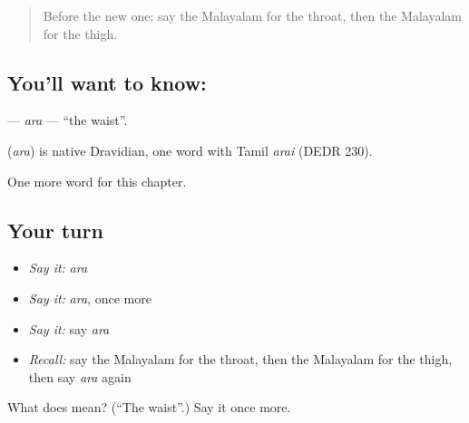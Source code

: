 \begin{quote}
Before the new one: say the Malayalam for the throat, then the Malayalam for the thigh.
\end{quote}

\subsection*{You'll want to know: }
\textbf{} — \emph{ara} — \textquotedblleft{}the waist\textquotedblright{}.

\begin{cousinweb}
\textbf{} (\emph{ara}) is native Dravidian, one word with Tamil \emph{arai} (DEDR 230).
\end{cousinweb}

\begin{grammarlens}[title={What you've built}]
One more word for this chapter.
\end{grammarlens}

\subsection*{Your turn}
\begin{itemize}
\raggedright
  \item \emph{Say it:} \emph{ara}
  \item \emph{Say it:} \emph{ara}, once more
  \item \emph{Say it:} say \emph{ara}
  \item \emph{Recall:} say the Malayalam for the throat, then the Malayalam for the thigh, then say \emph{ara} again
\end{itemize}

\begin{tcolorbox}[breakable,colback=teal!4,colframe=teal!35!black,title={Before you move on}]
What does  mean? (\textquotedblleft{}The waist\textquotedblright{}.) Say it once more.
\end{tcolorbox}
